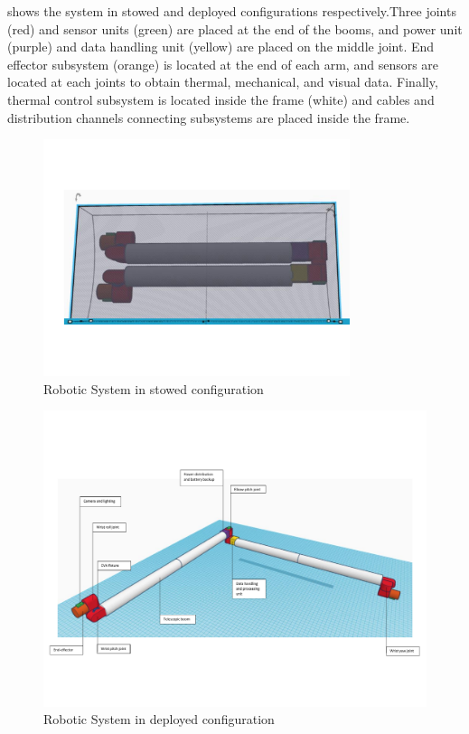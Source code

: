 \documentclass[12pt, letterpaper]{article}
\begin{document}
 shows the system in stowed and deployed configurations respectively.Three joints (red) and sensor units (green) are placed at the end of the booms, and power unit (purple) and data handling unit (yellow) are placed on the middle joint. End effector subsystem (orange) is located at the end of each arm, and sensors are located at each joints to obtain thermal, mechanical, and visual data. Finally, thermal control subsystem is located inside the frame (white) and cables and distribution channels connecting subsystems are placed inside the frame.

\begin{figure}[H]
\centering
\includegraphics[width=0.8\textwidth]{stowedarm}
\caption{Robotic System in stowed configuration}
\label{fig:stowedarm}
\end{figure}

\begin{figure}[H]
\centering
\includegraphics[width=\textwidth]{openedarm}
\caption{Robotic System in deployed configuration}
\label{fig:openedarm}
\end{figure}
\end{document}
